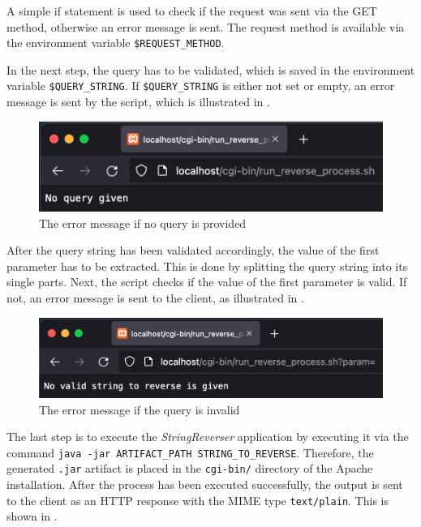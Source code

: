 A simple if statement is used to check if the request was sent via the GET method, otherwise an error message is sent. The request method is available via the environment variable \texttt{\$REQUEST\_METHOD}.


In the next step, the query has to be validated, which is saved in the environment variable \texttt{\$QUERY\_STRING}. If \texttt{\$QUERY\_STRING} is either not set or empty, an error message is sent by the script, which is illustrated in .

\begin{figure}[h]
\centering
\includegraphics[scale=0.6]{images/part2Failure1}
\caption{The error message if no query is provided}
\label{fig:02_part2_impl_failure1}
\end{figure}

After the query string has been validated accordingly, the value of the first parameter has to be extracted. This is done by splitting the query string into its single parts. Next, the script checks if the value of the first parameter is valid. If not, an error message is sent to the client, as illustrated in .

\begin{figure}[h]
\centering
\includegraphics[scale=0.6]{images/part2Failure2}
\caption{The error message if the query is invalid}
\label{fig:02_part2_impl_failure2}
\end{figure}

The last step is to execute the \textit{StringReverser} application by executing it via the command \texttt{java -jar ARTIFACT\_PATH STRING\_TO\_REVERSE}. Therefore, the generated \texttt{.jar} artifact is placed in the \texttt{cgi-bin/} directory of the Apache installation. After the process has been executed successfully, the output is sent to the client as an HTTP response with the MIME type \texttt{text/plain}. This is shown in .

